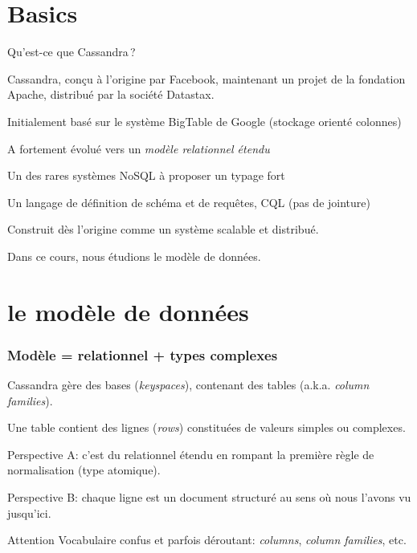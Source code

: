 

\section{Basics}

\begin{frame}{Qu'est-ce que Cassandra\,?}

Cassandra, conçu à l'origine par Facebook, maintenant un projet de la fondation Apache,
distribué par la société Datastax.

\begin{redbullet}
  \item Initialement basé sur le système BigTable de Google (stockage orienté colonnes)
   \item A fortement évolué vers un \textit{modèle relationnel étendu}
  \item Un des rares systèmes NoSQL à proposer un typage fort
  \item Un langage de définition de schéma et de requêtes, CQL (pas de jointure)
    \end{redbullet}
   \vfill
   
Construit dès l'origine comme un système \alert{scalable} et \alert{distribué}.

\vfill

\alert{Dans ce cours, nous étudions le modèle de données.}

\end{frame}


\section{le modèle de données}


\begin{frame}
\frametitle{Modèle = relationnel + types complexes}

Cassandra gère des \alert{bases} (\textit{keyspaces}), contenant des \alert{tables} (a.k.a.
\textit{column families}).

\vfill

Une table contient des \alert{lignes} (\textit{rows}) constituées de \alert{valeurs simples}
ou \alert{complexes}.

\vfill

\alert{Perspective A}: c'est du relationnel étendu en rompant la première règle de normalisation (type atomique).

\vfill

\alert{Perspective B}: chaque ligne est un document structuré au sens où nous l'avons vu jusqu'ici.

\vfill

\begin{remblock}{Attention}
Vocabulaire confus et parfois déroutant: \textit{columns}, \textit{column families}, etc.
\end{remblock}

\end{frame}


